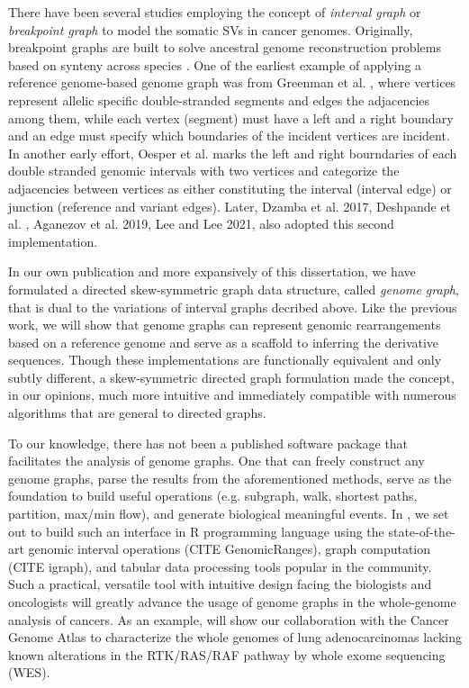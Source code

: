 \documentclass[phd,tocprelim]{cornell}
\begin{document}
There have been several studies employing the concept of \textit{interval graph} or \textit{breakpoint graph} to model the somatic SVs in cancer genomes. Originally, breakpoint graphs are built to solve ancestral genome reconstruction problems based on synteny across species \cite{Alekseyev2009-fw,Avdeyev2016-un}. One of the earliest example of applying a reference genome-based genome graph was from Greenman et al. \cite{Greenman:2012eg}, where vertices represent allelic specific double-stranded segments and edges the adjacencies among them, while each vertex (segment) must have a left and a right boundary and an edge must specify which boundaries of the incident vertices are incident. In another early effort, Oesper et al. \cite{Oesper2012-vw} marks the left and right bourndaries of each double stranded genomic intervals with two vertices and categorize the adjacencies between vertices as either constituting the interval (interval edge) or junction (reference and variant edges). Later, Dzamba et al. 2017\cite{Dzamba2017-wo}, Deshpande et al. \cite{Deshpande2019-gs}, Aganezov et al. 2019\cite{Aganezov2019-yh}, Lee and Lee 2021\cite{Lee2021-rl}, also adopted this second implementation.
 
In our own publication \cite{Hadi2020-um} and more expansively  of this dissertation, we have formulated a directed skew-symmetric graph data structure, called \textit{genome graph}, that is dual to the variations of interval graphs decribed above. Like the previous work, we will show that genome graphs can represent genomic rearrangements based on a reference genome and serve as a scaffold to inferring the derivative sequences. Though these implementations are functionally equivalent and only subtly different, a skew-symmetric directed graph formulation made the concept, in our opinions, much more intuitive and immediately compatible with numerous algorithms that are general to directed graphs.

To our knowledge, there has not been a published software package that facilitates the analysis of genome graphs. One that can freely construct any genome graphs, parse the results from the aforementioned methods, serve as the foundation to build useful operations (e.g. subgraph, walk, shortest paths, partition, max/min flow), and generate biological meaningful events. In , we set out to build such an interface in R programming language using the state-of-the-art genomic interval operations (CITE GenomicRanges), graph computation (CITE igraph), and tabular data processing tools popular in the community. Such a practical, versatile tool with intuitive design facing the biologists and oncologists will greatly advance the usage of genome graphs in the whole-genome analysis of cancers. As an example,  will show our collaboration with the Cancer Genome Atlas to characterize the whole genomes of lung adenocarcinomas lacking known alterations in the RTK/RAS/RAF pathway by whole exome sequencing (WES).
\end{document}
